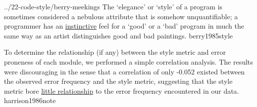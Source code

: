 \documentclass{article}
\begin{document}
\lnQuote
  {../22-code-style/berry-meekings}
  {The `elegance' or `style' of a program is sometimes considered a nebulous attribute that is somehow unquantifiable; a programmer has an \ul{instinctive} feel for a `good' or a `bad' program in much the same way as an artist distinguishes good and bad paintings.}
  {berry1985style}

  {To determine the relationship (if any) between the style metric and error proneness of each module, we performed a simple correlation analysis. The results were discouraging in the sense that a correlation of only -0.052 existed between the observed error frequency and the style metric, suggesting that the style metric bore \ul{little relationship} to the error frequency encountered in our data.}
  {harrison1986note}
\end{document}
